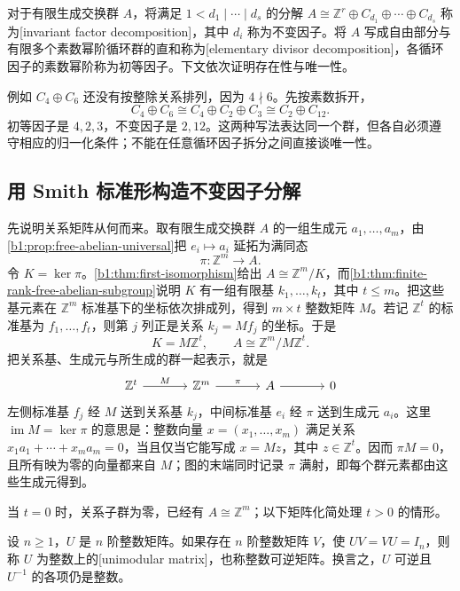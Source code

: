 对于有限生成交换群 \(A\)，将满足 \(1<d_1\mid\cdots\mid d_s\) 的分解 \(A\cong\mathbb Z^r\oplus C_{d_1}\oplus\cdots\oplus C_{d_s}\) 称为[invariant factor decomposition]，其中 \(d_i\) 称为不变因子。将 \(A\) 写成自由部分与有限多个素数幂阶循环群的直和称为[elementary divisor decomposition]，各循环因子的素数幂阶称为初等因子。下文依次证明存在性与唯一性。

\ProseParagraphBreak
例如 \(C_4\oplus C_6\) 还没有按整除关系排列，因为 \(4\nmid6\)。先按素数拆开，
\[
	C_4\oplus C_6\cong C_4\oplus C_2\oplus C_3 \cong C_2\oplus C_{12}.
\]
初等因子是 \(4,2,3\)，不变因子是 \(2,12\)。这两种写法表达同一个群，但各自必须遵守相应的归一化条件；不能在任意循环因子拆分之间直接谈唯一性。

\subsection{用 Smith 标准形构造不变因子分解}
\label{b1:subsec:0903:02}

先说明关系矩阵从何而来。取有限生成交换群 \(A\) 的一组生成元 \(a_1,\ldots,a_m\)，由\cref{b1:prop:free-abelian-universal}把 \(e_i\mapsto a_i\) 延拓为满同态
\[
	\pi:\mathbb Z^m\longrightarrow A.
\]
令 \(K=\ker\pi\)。\cref{b1:thm:first-isomorphism}给出 \(A\cong\mathbb Z^m/K\)，而\cref{b1:thm:finite-rank-free-abelian-subgroup}说明 \(K\) 有一组有限基 \(k_1,\ldots,k_t\)，其中 \(t\le m\)。把这些基元素在 \(\mathbb Z^m\) 标准基下的坐标依次排成列，得到 \(m\times t\) 整数矩阵 \(M\)。若记 \(\mathbb Z^t\) 的标准基为 \(f_1,\ldots,f_t\)，则第 \(j\) 列正是关系 \(k_j=Mf_j\) 的坐标。于是
\[
	K=M\mathbb Z^t,\qquad A\cong\mathbb Z^m/M\mathbb Z^t.
\]
把关系基、生成元与所生成的群一起表示，就是
\[
	\begin{tikzcd}[column sep=large]
		\mathbb Z^t \arrow[r,"M"] & \mathbb Z^m \arrow[r,"\pi"] & A \arrow[r] & 0
	\end{tikzcd}
\]
左侧标准基 \(f_j\) 经 \(M\) 送到关系基 \(k_j\)，中间标准基 \(e_i\) 经 \(\pi\) 送到生成元 \(a_i\)。这里 \(\operatorname{im}M=\ker\pi\) 的意思是：整数向量 \(x=(x_1,\ldots,x_m)\) 满足关系 \(x_1a_1+\cdots+x_ma_m=0\)，当且仅当它能写成 \(x=Mz\)，其中 \(z\in\mathbb Z^t\)。因而 \(\pi M=0\)，且所有映为零的向量都来自 \(M\)；图的末端同时记录 \(\pi\) 满射，即每个群元素都由这些生成元得到。

\ProseParagraphBreak
当 \(t=0\) 时，关系子群为零，已经有 \(A\cong\mathbb Z^m\)；以下矩阵化简处理 \(t>0\) 的情形。

\begin{definition}[整数上的幺模矩阵]\label{b1:def:integer-invertible-matrix}
	设 \(n\ge1\)，\(U\) 是 \(n\) 阶整数矩阵。如果存在 \(n\) 阶整数矩阵 \(V\)，使 \(UV=VU=I_n\)，则称 \(U\) 为整数上的[unimodular matrix]，也称整数可逆矩阵。换言之，\(U\) 可逆且 \(U^{-1}\) 的各项仍是整数。
\end{definition}

